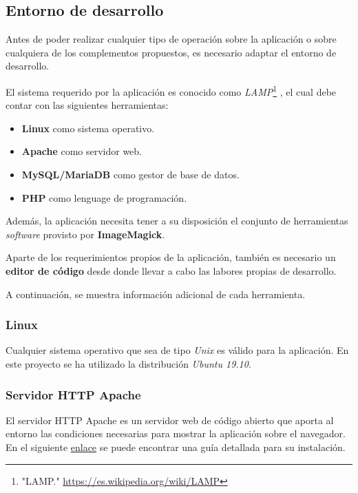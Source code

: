 \documentclass[
]{article}
\providecommand{\tightlist}{%
  \setlength{\itemsep}{0pt}\setlength{\parskip}{0pt}}
\begin{document}
\hypertarget{entorno-de-desarrollo}{%
\subsection{Entorno de desarrollo}\label{entorno-de-desarrollo}}

Antes de poder realizar cualquier tipo de operación sobre la aplicación
o sobre cualquiera de los complementos propuestos, es necesario adaptar
el entorno de desarrollo.

El sistema requerido por la aplicación es conocido como
\emph{LAMP}\footnote{"LAMP." \url{https://es.wikipedia.org/wiki/LAMP}} ,
el cual debe contar con las siguientes herramientas:

\begin{itemize}
\tightlist
\item
  \textbf{Linux} como sistema operativo.
\item
  \textbf{Apache} como servidor web.
\item
  \textbf{MySQL/MariaDB} como gestor de base de datos.
\item
  \textbf{PHP} como lenguage de programación.
\end{itemize}

Además, la aplicación necesita tener a su disposición el conjunto de
herramientas \emph{software} provisto por \textbf{ImageMagick}.

Aparte de los requerimientos propios de la aplicación, también es
necesario un \textbf{editor de código} desde donde llevar a cabo las
labores propias de desarrollo.

A continuación, se muestra información adicional de cada herramienta.

\hypertarget{linux}{%
\subsubsection{Linux}\label{linux}}

Cualquier sistema operativo que sea de tipo \emph{Unix} es válido para
la aplicación. En este proyecto se ha utilizado la distribución
\emph{Ubuntu 19.10}.

\hypertarget{servidor-http-apache}{%
\subsubsection{Servidor HTTP Apache}\label{servidor-http-apache}}

El servidor HTTP Apache es un servidor web de código abierto que aporta
al entorno las condiciones necesarias para mostrar la aplicación sobre
el navegador. En el siguiente
\href{http://httpd.apache.org/docs/trunk/es/install.html}{enlace} se
puede encontrar una guía detallada para su instalación.
\end{document}
